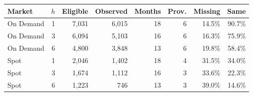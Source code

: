 \begin{tabular}{lrrrrrrr}
\toprule
Market & $h$ & Eligible & Observed & Months & Prov. & Missing & Same \\
\midrule
On Demand & 1 & 7,031 & 6,015 & 18 & 6 & 14.5\% & 90.7\% \\
On Demand & 3 & 6,094 & 5,103 & 16 & 6 & 16.3\% & 75.9\% \\
On Demand & 6 & 4,800 & 3,848 & 13 & 6 & 19.8\% & 58.4\% \\
Spot & 1 & 2,046 & 1,402 & 18 & 4 & 31.5\% & 34.0\% \\
Spot & 3 & 1,674 & 1,112 & 16 & 3 & 33.6\% & 22.3\% \\
Spot & 6 & 1,223 & 746 & 13 & 3 & 39.0\% & 14.6\% \\
\bottomrule
\end{tabular}
